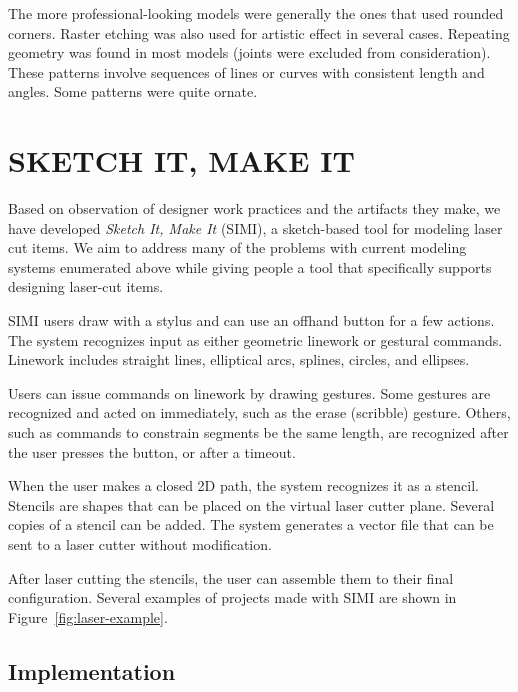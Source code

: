 \documentclass{article}
\begin{document}
The more professional-looking models were generally the ones that used
rounded corners. Raster etching was also used for artistic effect in
several cases. Repeating geometry was found in most models (joints
were excluded from consideration). These patterns involve sequences of
lines or curves with consistent length and angles. Some patterns were
quite ornate.

\section{SKETCH IT, MAKE IT}

Based on observation of designer work practices and the artifacts they
make, we have developed \textit{Sketch It, Make It} (SIMI), a
sketch-based tool for modeling laser cut items. We aim to address many
of the problems with current modeling systems enumerated above while
giving people a tool that specifically supports designing laser-cut
items. 



SIMI users draw with a stylus and can use an offhand button for a few
actions. The system recognizes input as either geometric linework or
gestural commands. Linework includes straight lines, elliptical arcs,
splines, circles, and ellipses. 

Users can issue commands on linework by drawing gestures. Some
gestures are recognized and acted on immediately, such as the erase
(scribble) gesture. Others, such as commands to constrain segments be
the same length, are recognized after the user presses the button, or
after a timeout.

When the user makes a closed 2D path, the system recognizes it as a
stencil. Stencils are shapes that can be placed on the virtual laser
cutter plane. Several copies of a stencil can be added. The system
generates a vector file that can be sent to a laser cutter without
modification.

After laser cutting the stencils, the user can assemble them to their
final configuration. Several examples of projects made with SIMI are
shown in Figure~\ref{fig:laser-example}.

\subsection{Implementation}
\end{document}
